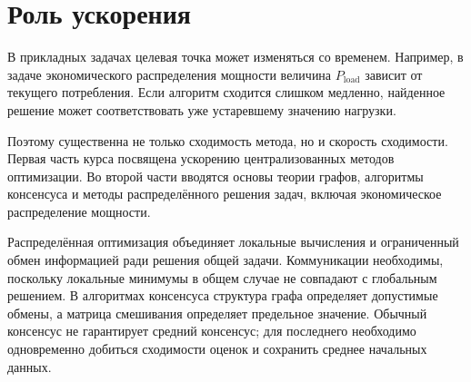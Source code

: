 \section{Роль ускорения}

В прикладных задачах целевая точка может изменяться со временем.
Например, в задаче экономического распределения мощности величина
\(P_{\mathrm{load}}\) зависит от текущего потребления. Если алгоритм
сходится слишком медленно, найденное решение может соответствовать
уже устаревшему значению нагрузки.

Поэтому существенна не только сходимость метода, но и скорость
сходимости. Первая часть курса посвящена ускорению централизованных
методов оптимизации. Во второй части вводятся основы теории графов,
алгоритмы консенсуса и методы распределённого решения задач,
включая экономическое распределение мощности.


Распределённая оптимизация объединяет локальные вычисления и
ограниченный обмен информацией ради решения общей задачи.
Коммуникации необходимы, поскольку локальные минимумы в общем случае
не совпадают с глобальным решением. В алгоритмах консенсуса структура
графа определяет допустимые обмены, а матрица смешивания определяет
предельное значение. Обычный консенсус не гарантирует средний
консенсус; для последнего необходимо одновременно добиться
сходимости оценок и сохранить среднее начальных данных.